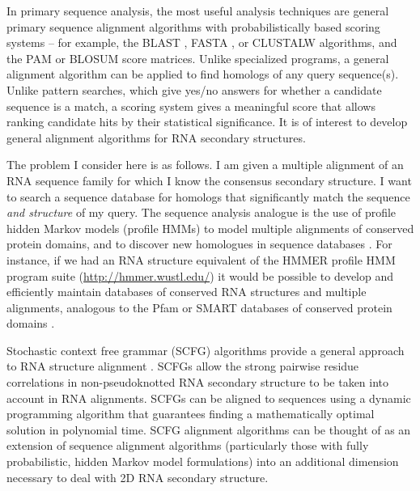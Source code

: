 \documentclass[11pt]{article}
\begin{document}
In primary sequence analysis, the most useful analysis techniques are
general primary sequence alignment algorithms with probabilistically
based scoring systems -- for example, the BLAST \cite{Altschul97},
FASTA \cite{Pearson88}, or CLUSTALW \cite{Thompson94b} algorithms, and
the PAM \cite{Dayhoff78} or BLOSUM \cite{Henikoff92} score
matrices. Unlike specialized programs, a general alignment algorithm
can be applied to find homologs of any query sequence(s). Unlike
pattern searches, which give yes/no answers for whether a candidate
sequence is a match, a scoring system gives a meaningful score that
allows ranking candidate hits by their statistical significance. It is
of interest to develop general alignment algorithms for RNA secondary
structures.

The problem I consider here is as follows.  I am given a multiple
alignment of an RNA sequence family for which I know the consensus
secondary structure. I want to search a sequence database for homologs
that significantly match the sequence \emph{and structure} of my
query. The sequence analysis analogue is the use of profile hidden
Markov models (profile HMMs) to model multiple alignments of conserved
protein domains, and to discover new homologues in sequence databases
\cite{Krogh94,Eddy98}. For instance, if we had an RNA structure
equivalent of the HMMER profile HMM program suite
(\url{http://hmmer.wustl.edu/}) it would be possible to develop and
efficiently maintain databases of conserved RNA structures and
multiple alignments, analogous to the Pfam or SMART databases of
conserved protein domains \cite{Bateman02,LetunikBork02}.

Stochastic context free grammar (SCFG) algorithms provide a general
approach to RNA structure alignment
\cite{Eddy94,Sakakibara94c,Durbin98}. SCFGs allow the strong pairwise
residue correlations in non-pseudoknotted RNA secondary structure to
be taken into account in RNA alignments. SCFGs can be aligned to
sequences using a dynamic programming algorithm that guarantees
finding a mathematically optimal solution in polynomial time. SCFG
alignment algorithms can be thought of as an extension of sequence
alignment algorithms (particularly those with fully probabilistic,
hidden Markov model formulations) into an additional dimension
necessary to deal with 2D RNA secondary structure.
\end{document}
